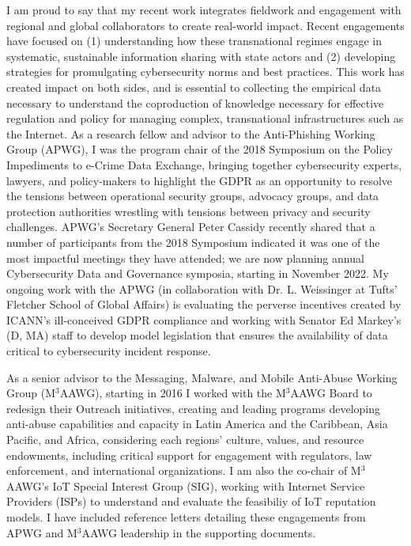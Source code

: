 \documentclass[11pt]{letter}
\begin{document}
\begin{letter}
I am proud to say that my recent work integrates fieldwork and engagement with regional and global collaborators to create real-world impact.
%
Recent engagements have focused on (1) understanding how these transnational regimes engage in systematic, sustainable information sharing with state actors and (2) developing strategies for promulgating cybersecurity norms and best practices.
%
This work has created impact on both sides, and is essential to collecting the empirical data necessary to understand the coproduction of knowledge necessary for effective regulation and policy for managing complex, transnational infrastructures such as the Internet.
%
As a research fellow and advisor to the Anti-Phishing Working Group (APWG), I was the program chair of the 2018 Symposium on the Policy Impediments to e-Crime Data Exchange, bringing together cybersecurity experts,
lawyers, and policy-makers to highlight the GDPR as an opportunity to resolve the tensions between operational security groups, advocacy groups, and data protection authorities wrestling with tensions between privacy and security challenges.
%
APWG's Secretary General Peter Cassidy recently shared that a number of participants from the 2018 Symposium indicated it was one of the most impactful meetings they have attended; we are now planning annual Cybersecurity Data and Governance symposia, starting in November 2022.
%
My ongoing work with the APWG (in collaboration with Dr. L. Weissinger at Tufts' Fletcher School of Global Affairs) is evaluating the perverse incentives created by ICANN's ill-conceived GDPR compliance and working with Senator Ed Markey's (D, MA) staff to develop model legislation that ensures the availability of data critical to cybersecurity incident response. 

%
As a senior advisor to the Messaging, Malware, and Mobile Anti-Abuse Working Group (M$^3$AAWG), starting in 2016 I worked with the M$^3$AAWG Board to redesign their Outreach initiatives, creating and leading 
programs developing anti-abuse capabilities and capacity in Latin America and the Caribbean, Asia Pacific, and Africa, considering each regions' culture, values, and resource endowments, including critical support for engagement with regulators, law enforcement, and international organizations.
%
I am also the co-chair of M$^3$AAWG's IoT Special Interest Group (SIG), working with Internet Service Providers (ISPs) to understand and evaluate the feasibiliy of IoT reputation models.
%
I have included reference letters detailing these engagements from APWG and M$^3$AAWG leadership in the supporting documents.


\end{letter}
\end{document}
